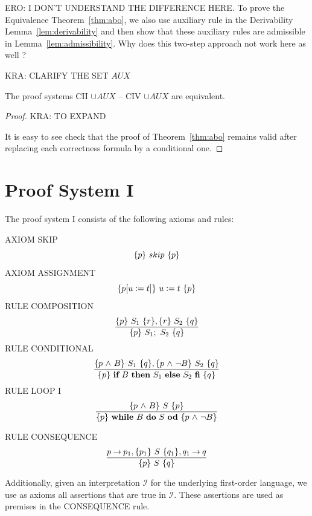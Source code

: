 \documentclass[manuscript, screen, review]{acmart}
\newcommand{\AUX}{\mathit{AUX}}
\begin{document}
ERO: I DON'T UNDERSTAND THE DIFFERENCE HERE. To prove the Equivalence Theorem~\ref{thm:abo}, we also use auxiliary
rule in the Derivability Lemma~\ref{lem:derivability} and then show that
these auxiliary rules are admissible in Lemma~\ref{lem:admissibility}.
Why does this two-step approach not work here as well ?


KRA: CLARIFY THE SET $\AUX$

\begin{theorem} \label{thm:main2}
  The proof systems CII $\cup \AUX$ -- CIV $\cup \AUX$  are equivalent.  
\end{theorem}

\begin{proof}
KRA:  TO EXPAND

  It is easy to see check that the proof of Theorem~\ref{thm:abo} remains valid after replacing each
  correctness formula by a conditional one.
\HB
\end{proof}


% 


\appendix

\section{Proof System I}
\label{sec:I}

The proof system I consists of the following axioms and rules:
\VV

\NI
AXIOM \label{rul:skip} SKIP
\[ \mbox{$\{{p}\}\ {skip}\ \{{p}\}$} \]
%
\NI
AXIOM \label{rul:assi} ASSIGNMENT
\[ \mbox{$\{{p[u:=t]}\}\ {u:=t}\ \{{p}\}$} \]
%
\NI
RULE \label{rul:comp} COMPOSITION
\[ \frac{ \mbox{$\{{p}\}\ {S_1}\ \{{r}\}$}, \mbox{$\{{r}\}\ {S_2}\ \{{q}\}$}                }
        { \mbox{$\{{p}\}\ {S_1;\ S_2}\ \{{q}\}$}                          }\]
%
\NI
RULE \label{rul:cond} CONDITIONAL
\[ \frac{ \mbox{$\{{p \mbox{$\ \wedge\ $} B}\}\ {S_1}\ \{{q}\}$}, \mbox{$\{{p \mbox{$\ \wedge\ $} \neg B}\}\ {S_2}\ \{{q}\}$}         }
        { \mbox{$\{{p}\}\ {\mbox{$\mbox{{\bf if}\ } {B} \mbox{\ {\bf then}\ } {S_1} \mbox{\ {\bf else}\ } {S_2}\ \mbox{{\bf fi}}$}}\ \{{q}\}$}                          }\]
%
\NI
RULE \label{rul:loop} LOOP I
\[ \frac{ \mbox{$\{{p \mbox{$\ \wedge\ $} B}\}\ {S}\ \{{p}\}$}                             }
        { \mbox{$\{{p}\}\ {\mbox{$\mbox{{\bf while}\ } {B}\ \mbox{{\bf do}\ } {S}\ \mbox{{\bf od}}$}}\ \{{p \mbox{$\ \wedge\ $} \neg B}\}$}               }\]
%

\NI
RULE \label{rul:cons} CONSEQUENCE
\[ \frac{ p \mbox{$\:\rightarrow\:$} p_1, \mbox{$\{{p_1}\}\ {S}\ \{{q_1}\}$}, q_1 \mbox{$\:\rightarrow\:$} q        }
        { \mbox{$\{{p}\}\ {S}\ \{{q}\}$}                                  }\]
%

Additionally, given an interpretation $\mathcal{I}$ for the underlying first-order language, 
we use as axioms all assertions that are true in $\mathcal{I}$. 
These assertions are used as premises in the CONSEQUENCE rule. 
\end{document}
